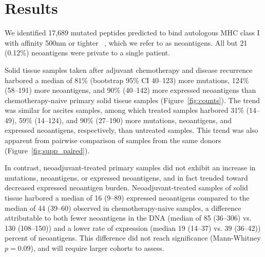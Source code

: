 \section*{Results}


We identified 17,689 mutated peptides predicted to bind autologous MHC class I with affinity 500nm or tighter ~\cite{Sette1994}, which we refer to as neoantigens. All but 21 (0.12\%) neoantigens were private to a single patient.

Solid tissue samples taken after adjuvant chemotherapy and disease recurrence harbored a median of 81\% (bootstrap 95\% CI 40--123) more mutations, 124\% (58--191) more neoantigens, and 90\% (40--142) more expressed neoantigens than chemotherapy-naive primary solid tissue samples (Figure~\ref{fig:counts}). The trend was similar for ascites samples, among which treated samples harbored 31\% (14--49), 59\% (14--124), and 90\% (27--190) more mutations, neoantigens, and expressed neoantigens, respectively, than untreated samples. This trend was also apparent from pairwise comparison of samples from the same donors (Figure~\ref{fig:supp_paired}). 


In contrast, neoadjuvant-treated primary samples did not exhibit an increase in mutations, neoantigens, or expressed neoantigens, and in fact trended toward decreased expressed neoantigen burden. Neoadjuvant-treated samples of solid tissue harbored a median of 16 (9--89) expressed neoantigens compared to the median of 44 (39--60) observed in chemotherapy-naive samples, a difference attributable to both fewer neoantigens in the DNA (median of 85 (36--306) vs. 130 (108--150)) and a lower rate of expression (median 19 (14--37) vs. 39 (36--42)) percent of neoantigens. This difference did not reach significance (Mann-Whitney $p=0.09$), and will require larger cohorts to assess.


